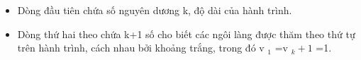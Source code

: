 \begin{itemize}
	\item     Dòng đầu tiên chứa số nguyên dương k, độ dài của hành trình.   
	\item     Dòng thứ hai theo chứa k+1 số cho biết các ngôi làng được thăm theo thứ tự trên hành trình, cách nhau bởi khoảng trắng, trong đó v    $_     1    $    =v    $_     k+1    $    =1.   
\end{itemize}